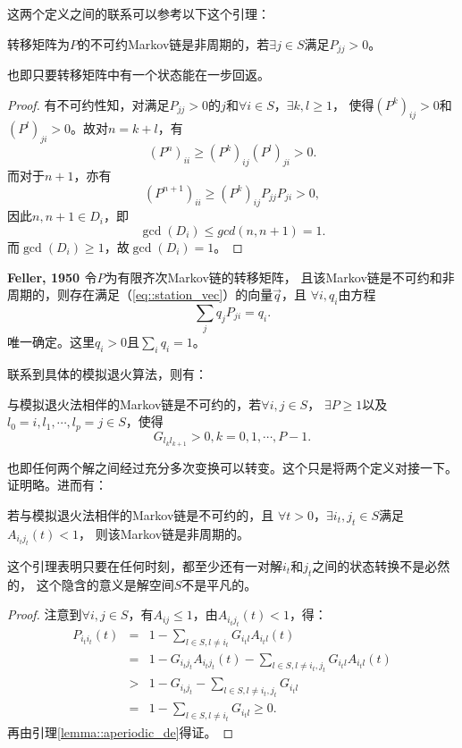这两个定义之间的联系可以参考以下这个引理：

\begin{lemma}{}
  转移矩阵为$P$的不可约Markov链是非周期的，若$\exists j \in S$满足$P_{jj} > 0$。
  \label{lemma::aperiodic_de}
\end{lemma}
也即只要转移矩阵中有一个状态能在一步回返。

\begin{proof}
  有不可约性知，对满足$P_{jj} > 0$的$j$和$\forall i \in S$，$\exists k, l \geq 1$，
  使得$(P^k)_{ij} > 0$和$(P^l)_{ji} > 0$。故对$n = k + l$，有
  $$
  (P^n)_{ii} \geq (P^k)_{ij}(P^l)_{ji} > 0.
  $$
  而对于$n + 1$，亦有
  $$
  (P^{n + 1})_{ii} \geq (P^k)_{ij}P_{jj}P_{ji} > 0,
  $$
  因此$n ,n + 1 \in D_i$，即
  $$
  \gcd(D_i) \leq gcd(n, n + 1) = 1.
  $$
  而$\gcd(D_i) \geq 1$，故$\gcd(D_i) = 1$。
\end{proof}

\begin{theorem}{\bf Feller, 1950 \cite{Feller1950An}} 令$P$为有限齐次Markov链的转移矩阵，
  且该Markov链是不可约和非周期的，则存在满足（\ref{eq::station_vec}）的向量$\vec{q}$，且
  $\forall i, q_i$由方程
  \begin{equation}
    \sum_jq_jP_{ji} = q_i.
  \end{equation}
  唯一确定。这里$q_i > 0$且$\sum_i q_i = 1$。
\end{theorem}


联系到具体的模拟退火算法，则有：

\begin{lemma}{} 与模拟退火法相伴的Markov链是不可约的，若$\forall i, j \in S$，
  $\exists P \geq 1$以及$l_0 = i, l_1, \cdots, l_p = j \in S$，使得
  \begin{equation}
    G_{l_kl_{k + 1}} > 0, k = 0, 1, \cdots, P - 1.
  \end{equation}
\end{lemma}
也即任何两个解之间经过充分多次变换可以转变。这个只是将两个定义对接一下。证明略。进而有：

\begin{lemma}{} 若与模拟退火法相伴的Markov链是不可约的，且
  $\forall t > 0$，$\exists i_t, j_t \in S$满足$A_{i_tj_t}(t) < 1$，
  则该Markov链是非周期的。
\end{lemma}
这个引理表明只要在任何时刻，都至少还有一对解$i_t$和$j_t$之间的状态转换不是必然的，
这个隐含的意义是解空间$S$不是平凡的。

\begin{proof}
  注意到$\forall i, j \in S$，有$A_{ij} \leq 1$，由$A_{i_tj_t}(t) < 1$，得：
  \begin{eqnarray*}
    P_{i_ti_t}(t) & = & 1 - \sum_{l \in S, l \neq i_t} G_{i_tl}A_{i_tl}(t) \\
    & = & 1 - G_{i_tj_t}A_{i_tj_t}(t) - \sum_{l \in S, l \neq i_t, j_t} G_{i_tl}A_{i_tl}(t) \\
    & > & 1 - G_{i_tj_t} - \sum_{l \in S, l \neq i_t, j_t}G_{i_tl} \\
    & = & 1 - \sum_{l \in S, l \neq i_t} G_{i_tl} \geq 0.
  \end{eqnarray*}
  再由引理\ref{lemma::aperiodic_de}得证。
\end{proof}

